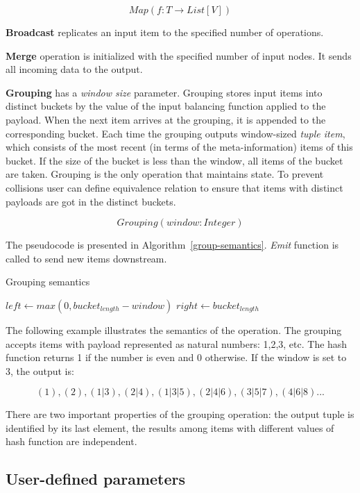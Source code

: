 \[Map(f: T \rightarrow List[V])\]

{\bf Broadcast} replicates an input item to the specified number of operations.

{\bf Merge} operation is initialized with the specified number of input nodes. It sends all incoming data to the output.

{\bf Grouping} has a {\it window size} parameter. Grouping stores input items into distinct buckets by the value of the input balancing function applied to the payload. When the next item arrives at the grouping, it is appended to the corresponding bucket. Each time the grouping outputs window-sized {\it tuple item}, which consists of the most recent (in terms of the meta-information) items of this bucket. If the size of the bucket is less than the window, all items of the bucket are taken. Grouping is the only operation that maintains state. To prevent collisions user can define equivalence relation to ensure that items with distinct payloads are got in the distinct buckets.

\[Grouping(window: Integer)\]

The pseudocode is presented in Algorithm~\ref{group-semantics}. {\it Emit} function is called to send new items downstream.

\begin{algorithm}
\caption{Grouping semantics}
\label{group-semantics}
  \begin{algorithmic}[1]
      \State {}
      \State $left \gets max(0, bucket_{length} - window)$
      \State $right \gets bucket_{length}$
      \State {}
    \EndFunction
  \end{algorithmic}
\end{algorithm}

The following example illustrates the semantics of the operation. The grouping accepts items with payload represented as natural numbers: 1,2,3, etc. The hash function returns 1 if the number is even and 0 otherwise. If the window is set to 3, the output is:

\[(1), (2), (1|3), (2|4), (1|3|5), (2|4|6), (3|5|7), (4|6|8)...\]

There are two important properties of the grouping operation: the output tuple is identified by its last element, the results among items with different values of hash function are independent.

\subsection{User-defined parameters}

